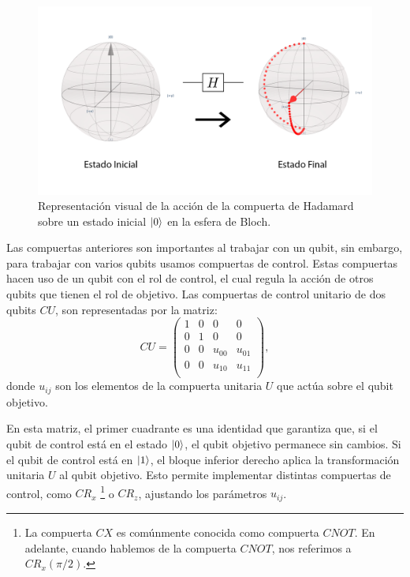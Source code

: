 \documentclass[letterpaper,12pt]{thesisECFM}
\theoremstyle{plain}
\theoremstyle{definition}
\theoremstyle{definition}
\theoremstyle{remark}
\newcommand{\1}{\mathbb{1}}
\begin{document}
\begin{figure}
    \centering
    \includegraphics[scale=0.15]{imagenes/Haddamard.png}
    \caption{Representación visual de la acción de la compuerta de Hadamard sobre un estado inicial $\ket{0}$ en la esfera de Bloch.}
    \label{fig:hadamard}
\end{figure}

Las compuertas anteriores son importantes al trabajar con un qubit, sin
embargo, para trabajar con varios qubits usamos compuertas de control.
Estas compuertas hacen uso de un qubit con el rol de  control, el cual
regula la acción de otros qubits que tienen el rol de objetivo. Las compuertas de control unitario de dos qubits $CU$, son representadas por la matriz:
\begin{equation}
    CU = 
    \begin{pmatrix}
    \label{ec:2.27}
    1 & 0 & 0 & 0 \\
    0 & 1 & 0 & 0 \\
     0& 0 & u_{00} & u_{01} \\
     0&  0&  u_{10}&u_{11} \\
    \end{pmatrix},
\end{equation}
donde $u_{ij}$ son los elementos de la compuerta unitaria $U$ que actúa sobre el qubit objetivo.

En esta matriz, el primer cuadrante es una identidad que garantiza que, si el qubit de control está en el estado $\ket{0}$, el qubit objetivo permanece sin cambios. Si el qubit de control está en $\ket{1}$, el bloque inferior derecho aplica la transformación unitaria $U$ al qubit objetivo. Esto permite implementar distintas compuertas de control, como $CR_x$ \footnote{La compuerta $CX$ es comúnmente conocida como compuerta $CNOT$. En adelante, cuando hablemos de la compuerta $CNOT$, nos referimos a $CR_x(\pi/2)$.}  o $CR_z$, ajustando los parámetros $u_{ij}$.
\end{document}
